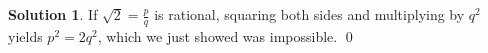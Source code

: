 \documentclass{article}
\theoremstyle{definition}
\newtheorem*{solution}{Solution}
\begin{document}
\begin{enumerate}
\begin{solution}
If $\sqrt{2} = \frac{p}{q}$ is rational, squaring both sides and multiplying by $q^2$ yields $p^2 = 2q^2$, which we just showed was impossible. \qed
\end{solution}
\end{enumerate}
\end{document}
